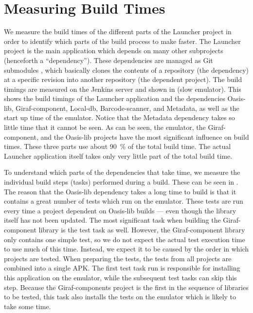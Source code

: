 \section{Measuring Build Times}\label{sec:measuring_build_times}
We measure the build times of the different parts of the Launcher project in order to identify which parts of the build process to make faster. The Launcher project is the main application which depends on many other subprojects (henceforth a ``dependency''). These dependencies are managed as Git submodules \parencite{git-submodules-doc}, which basically clones the contents of a repository (the dependency) at a specific revision into another repository (the dependent project). The build timings are measured on the Jenkins server and shown in  (slow emulator). This shows the build timings of the Launcher application and the dependencies Oasis-lib, Giraf-component, Local-db, Barcode-scanner, and Metadata, as well as the start up time of the emulator. Notice that the Metadata dependency takes so little time that it cannot be seen. As can be seen, the emulator, the Giraf-component, and the Oasis-lib projects have the most significant influence on build times. These three parts use about \SI{90}{\percent} of the total build time. The actual Launcher application itself takes only very little part of the total build time.

To understand which parts of the dependencies that take time, we measure the individual build steps (tasks) performed during a build. These can be seen in . The reason that the Oasis-lib dependency takes a long time to build is that it contains a great number of tests which run on the emulator. These tests are run every time a project dependent on Oasis-lib builds --- even though the library itself has not been updated. The most significant task when building the Giraf-component library is the test task as well. However, the Giraf-component library only contains one simple test, so we do not expect the actual test execution time to use much of this time. Instead, we expect it to be caused by the order in which projects are tested. When preparing the tests, the tests from all projects are combined into a single APK\@. The first test task run is responsible for installing this application on the emulator, while the subsequent test tasks can skip this step. Because the Giraf-components project is the first in the sequence of libraries to be tested, this task also installs the tests on the emulator which is likely to take some time.

